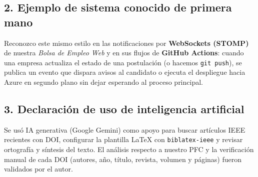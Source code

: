 \documentclass[11pt,a4paper]{article}
\begin{document}
\subsection*{2. Ejemplo de sistema conocido de primera mano}
Reconozco este mismo estilo en las notificaciones por \textbf{WebSockets (STOMP)} de nuestra \textit{Bolsa de Empleo Web} y en sus flujos de \textbf{GitHub Actions}: cuando una empresa actualiza el estado de una postulación (o hacemos \texttt{git push}), se publica un evento que dispara avisos al candidato o ejecuta el despliegue hacia Azure en segundo plano sin dejar esperando al proceso principal.

\subsection*{3. Declaración de uso de inteligencia artificial}
Se usó IA generativa (Google Gemini) como apoyo para buscar artículos IEEE recientes con DOI, configurar la plantilla \LaTeX{} con \texttt{biblatex-ieee} y revisar ortografía y síntesis del texto. El análisis respecto a nuestro PFC y la verificación manual de cada DOI (autores, año, título, revista, volumen y páginas) fueron validados por el autor.

\vspace{0.2cm}
\printbibliography[title={Referencias}]
\end{document}
